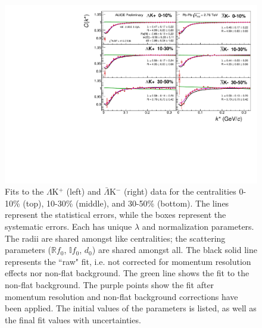 \documentclass[../AnalysisNoteJBuxton.tex]{subfiles}
\begin{document}
\begin{figure}[h]
  \centering
  \includegraphics[width=\textwidth]{7_ResultsAndDiscussion/Figures/canKStarCfwFitsLamKchPwConj_0010_1030_3050_MomResCrctn_NonFlatBgdCrctn_NoRes.pdf}
  \caption[$\Lambda$K$^{+}$($\bar{\Lambda}$K$^{-}$) Fits, with NO residual correlations included, with No Residuals]{Fits to the $\Lambda$K$^{+}$ (left) and $\bar{\Lambda}$K$^{-}$ (right) data for the centralities 0-10\% (top), 10-30\% (middle), and 30-50\% (bottom).
The lines represent the statistical errors, while the boxes represent the systematic errors.  
Each has unique $\lambda$ and normalization parameters.
The radii are shared amongst like centralities; the scattering parameters ($\mathbb{R}f_{0}$, $\mathbb{I}f_{0}$, $d_{0}$) are shared amongst all.
The black solid line represents the ``raw" fit, i.e. not corrected for momentum resolution effects nor non-flat background.  
The green line shows the fit to the non-flat background.
The purple points show the fit after momentum resolution and non-flat background corrections have been applied.
The initial values of the parameters is listed, as well as the final fit values with uncertainties.}
  \label{fig:LamKchPwConjFits_NoRes}
\end{figure}
\end{document}
